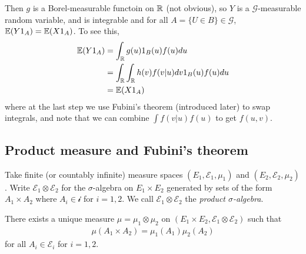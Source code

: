\documentclass[a4paper]{article}
\begin{document}
Then $g$ is a Borel-measurable functoin on $\mathbb{R}$ (not obvious), so $Y$ is a $\mathcal{G}$-measurable random variable, and is integrable and for all $A = \{U \in B\} \in \mathcal{G}$, $\mathbb{E}(Y 1_A ) = \mathbb{E}(X 1_A)$. To see this, 
\begin{equation*}
\begin{aligned}
\mathbb{E}(Y1_A) &=\int_{\mathbb{R}} g(u) 1_B(u) f(u) du\\
&= \int_{\mathbb{R}} \int_{\mathbb{R}} h(v)f(v|u) dv 1_B(u) f(u) du\\
&=\mathbb{E}(X1_A)
\end{aligned}
\end{equation*}
where at the last step we use Fubini's theorem (introduced later) to swap integrals, and note that we can combine $\int f(v|u) f(u)$ to get $f(u,v)$.

\subsection{Product measure and Fubini's theorem}
Take finite (or countably infinite) measure spaces $(E_1,\mathcal{E}_1,\mu_1)$ and $(E_2,\mathcal{E}_2,\mu_2)$. Write $\mathcal{E}_1 \otimes \mathcal{E}_2$ for the $\sigma$-algebra on $E_1 \times E_2$ generated by sets of the form $A_1 \times A_2$ where $A_i \in \mathcal{i}$ for $i=1,2$. We call $\mathcal{E}_1 \otimes \mathcal{E}_2$ the \emph{product $\sigma$-algebra}.

\begin{thm}
There exists a unique measure $\mu=\mu_1 \otimes \mu_2$ on $(E_1 \times E_2, \mathcal{E}_1 \otimes \mathcal{E}_2)$ such that
\begin{equation*}
\begin{aligned}
\mu(A_1 \times A_2) = \mu_1(A_1) \mu_2(A_2)
\end{aligned}
\end{equation*}
for all $A_i \in \mathcal{E}_i$ for $i=1,2$.
\end{thm}
\end{document}
